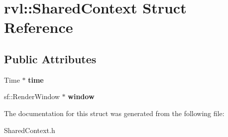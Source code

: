 \hypertarget{structrvl_1_1_shared_context}{}\section{rvl\+:\+:Shared\+Context Struct Reference}
\label{structrvl_1_1_shared_context}
\subsection*{Public Attributes}
\begin{DoxyCompactItemize}
\item 
\mbox{\label{structrvl_1_1_shared_context_aa7cc22c51d90b03ebb095f204d138795}} 
Time $\ast$ {\bfseries time}
\item 
\mbox{\label{structrvl_1_1_shared_context_a616231b97cd2354f155598b77d76508d}} 
sf\+::\+Render\+Window $\ast$ {\bfseries window}
\end{DoxyCompactItemize}


The documentation for this struct was generated from the following file\+:\begin{DoxyCompactItemize}
\item 
Shared\+Context.\+h\end{DoxyCompactItemize}
